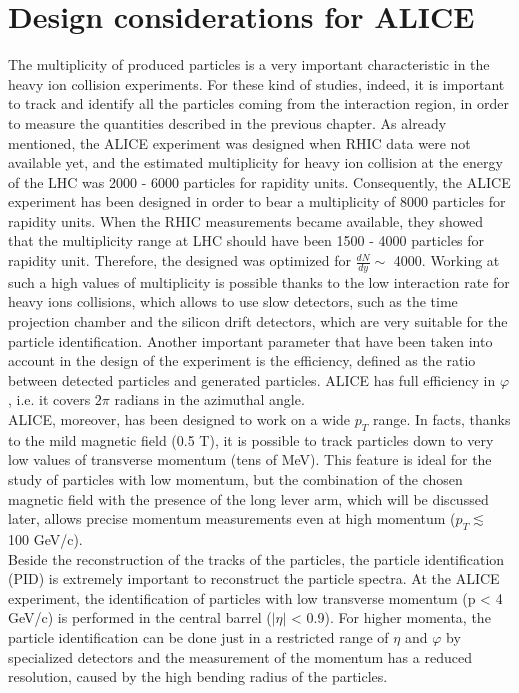 \section{Design considerations for ALICE}
The multiplicity of produced particles is a very important characteristic in the heavy ion collision experiments. For these kind of studies, indeed, it is important to track and identify all the particles coming from the interaction region, in order to measure the quantities described in the previous chapter. As already mentioned, the ALICE experiment was designed when RHIC data were not available yet, and the estimated multiplicity for heavy ion collision at the energy of the LHC was 2000 - 6000 particles for rapidity units. Consequently, the ALICE experiment has been designed in order to bear a multiplicity of 8000 particles for rapidity units. When the RHIC measurements became available, they showed that the multiplicity range at LHC should have been 1500 - 4000 particles for rapidity unit. Therefore, the designed was optimized for $\frac{dN}{dy}\sim$ 4000. Working at such a high values of multiplicity is possible thanks to the low interaction rate for heavy ions collisions, which allows to use slow detectors, such as the time projection chamber and the silicon drift detectors, which are very suitable for the particle identification. Another important parameter that have been taken into account in the design of the experiment is the efficiency, defined as the ratio between detected particles and generated particles. ALICE has full efficiency in $\varphi$, i.e. it covers $2\pi$ radians in the azimuthal angle.\\
ALICE, moreover, has been designed to work on a wide $p_T$ range. In facts, thanks to the mild magnetic field (0.5 T), it is possible to track particles down to very low values of transverse momentum (tens of MeV). This feature is ideal for the study of particles with low momentum, but the combination of the chosen magnetic field with the presence of the long lever arm, which will be discussed later, allows precise momentum measurements even at high momentum ($p_T\lesssim$ 100 GeV/c).\\
Beside the reconstruction of the tracks of the particles, the particle identification (PID) is extremely important to reconstruct the particle spectra. At the ALICE experiment, the identification of particles with low transverse momentum (p < 4 GeV/c) is performed in the central barrel ($|\eta|$ < 0.9). For higher momenta, the particle identification can be done just in a restricted range of $\eta$ and $\varphi$ by specialized detectors and the measurement of the momentum has a reduced resolution, caused by the high bending radius of the particles.
